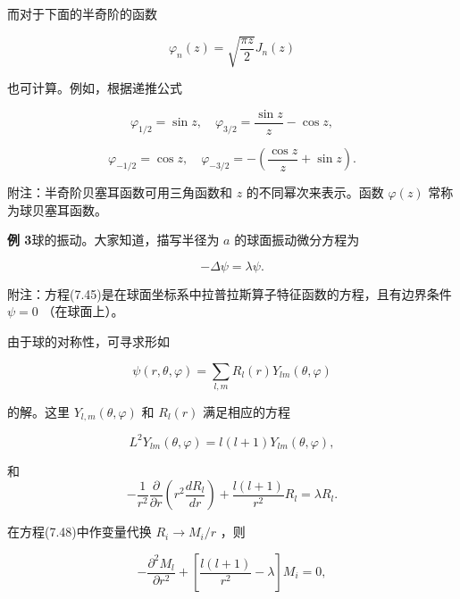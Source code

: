 而对于下面的半奇阶的函数

\begin{equation*}
\varphi_ {n} (z) = \sqrt {\frac {\pi z}{2}} J _ {n} (z)
\end{equation*}

也可计算。例如，根据递推公式

\begin{equation*}
\varphi_ {1 / 2} = \sin z, \quad \varphi_ {3 / 2} = \frac {\sin z}{z} - \cos z,
\end{equation*}

\begin{equation*}
\varphi_ {- 1 / 2} = \cos z, \quad \varphi_ {- 3 / 2} = - \left(\frac {\cos z}{z} + \sin z\right).
\end{equation*}

附注：半奇阶贝塞耳函数可用三角函数和 $z$ 的不同幂次来表示。函数 $\varphi(z)$ 常称为球贝塞耳函数。

\textbf{例 3}\quad 球的振动。大家知道，描写半径为 $a$ 的球面振动微分方程为

\begin{equation*}
- \Delta \psi = \lambda \psi .\tag{7.45}
\end{equation*}

附注：方程(7.45)是在球面坐标系中拉普拉斯算子特征函数的方程，且有边界条件 $\psi = 0$ （在球面上）。

由于球的对称性，可寻求形如

\begin{equation*}
\psi (r, \theta , \varphi) = \sum_ {l, m} R _ {l} (r) Y _ {l m} (\theta , \varphi)\tag{7.46}
\end{equation*}

的解。这里 $Y_{l,m}(\theta, \varphi)$ 和 $R_l(r)$ 满足相应的方程

\begin{equation*}
L ^ {2} Y _ {l m} (\theta , \varphi) = l (l + 1) Y _ {l m} (\theta , \varphi),\tag{7.47}
\end{equation*}

和
\begin{equation*}
- \frac {1}{r ^ {2}} \frac {\partial}{\partial r} \left(r ^ {2} \frac {d R _ {l}}{d r}\right) + \frac {l (l + 1)}{r ^ {2}} R _ {l} = \lambda R _ {l}.\tag{7.48}
\end{equation*}

在方程(7.48)中作变量代换 $R_{i}\rightarrow M_{i} / r$ ，则

\begin{equation*}
- \frac {\partial^ {2} M _ {l}}{\partial r ^ {2}} + \left[ \frac {l (l + 1)}{r ^ {2}} - \lambda \right] M _ {i} = 0,
\end{equation*}

